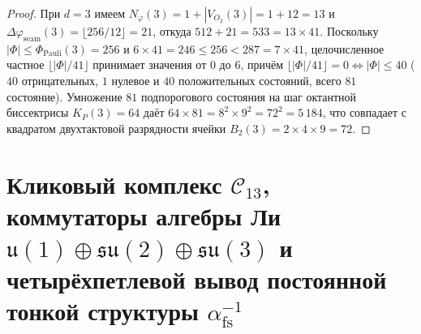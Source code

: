 \documentclass[11pt,a4paper]{article}
\theoremstyle{plain}
\theoremstyle{definition}
\begin{document}
\begin{proof}
При $d = 3$ имеем $N_\varphi(3) = 1 + |V_{O_2}(3)| = 1 + 12 = 13$ и $\Delta\varphi_{\mathrm{seam}}(3) = \lfloor 256 / 12\rfloor = 21$, откуда $512 + 21 = 533 = 13 \times 41$. Поскольку $|\Phi| \le \Phi_{\mathrm{Pauli}}(3) = 256$ и $6 \times 41 = 246 \le 256 < 287 = 7 \times 41$, целочисленное частное $\lfloor |\Phi|/41\rfloor$ принимает значения от $0$ до $6$, причём $\lfloor |\Phi|/41\rfloor = 0 \iff |\Phi| \le 40$ ($40$ отрицательных, $1$ нулевое и $40$ положительных состояний, всего $81$ состояние). Умножение $81$ подпорогового состояния на шаг октантной биссектрисы $K_P(3) = 64$ даёт $64 \times 81 = 8^2 \times 9^2 = 72^2 = 5\,184$, что совпадает с квадратом двухтактовой разрядности ячейки $B_2(3) = 2 \times 4 \times 9 = 72$.
\end{proof}

\section{Кликовый комплекс \texorpdfstring{$\mathcal{C}_{13}$}{C13}, коммутаторы алгебры Ли \texorpdfstring{$\mathfrak{u}(1)\oplus\mathfrak{su}(2)\oplus\mathfrak{su}(3)$}{u(1)+su(2)+su(3)} и четырёхпетлевой вывод постоянной тонкой структуры \texorpdfstring{$\alpha_{\mathrm{fs}}^{-1}$}{alpha\_fs\^{}(-1)}}
\label{sec:sm-alpha}
\end{document}
